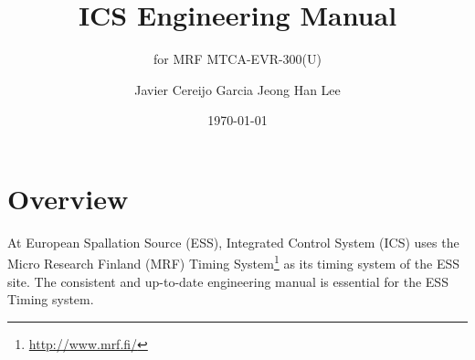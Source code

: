 \documentclass[11pt
  , a4paper
  , article
  , oneside
  , showtrims
]{memoir}
\begin{document}


\date{\today}




\title{ICS Engineering Manual}
\subtitle{for MRF MTCA-EVR-300(U)}
\author{Javier Cereijo Garcia \newline Jeong Han Lee }



\showtrimson

\esstitle
\newpage
\tableofcontents
\newpage



\chapter{Overview}
At European Spallation Source (ESS), Integrated Control System (ICS) uses the Micro Research Finland (MRF) Timing System{\footnote{\url{http://www.mrf.fi/}}} as its timing system of the ESS site. The consistent and up-to-date engineering manual is essential for the ESS Timing system.
\end{document}
